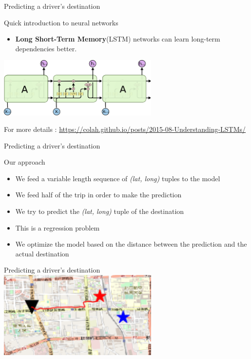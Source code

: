 \documentclass[aspectratio=169]{beamer}
\begin{document}
\begin{frame}{Predicting a driver's destination}

{\Large Quick introduction to neural networks}

\begin{itemize}
	\item \textbf{Long Short-Term Memory}(LSTM) networks can learn long-term dependencies better.
\end{itemize}
\centering
\includegraphics[width=0.6\textwidth]{figures/lstm}

For more details : \url{https://colah.github.io/posts/2015-08-Understanding-LSTMs/}

\end{frame}

\begin{frame}{Predicting a driver's destination}

{\Large Our approach}

\begin{itemize}
	\item We feed a variable length sequence of \textit{(lat, long)} tuples to the model
	\item We feed half of the trip in order to make the prediction
	\item We try to predict the \textit{(lat, long)} tuple of the destination
	\item This is a regression problem
	\item We optimize the model based on the distance between the prediction and the actual destination
\end{itemize}
\end{frame}

\begin{frame}{Predicting a driver's destination}
\centering
\includegraphics[width=0.6\textwidth]{figures/ex1_reg}
\end{frame}
\end{document}
